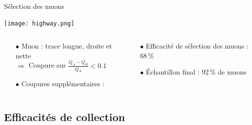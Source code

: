     \begin{frame}{Sélection des muons}
        \begin{scriptsize}
        \texttt{[image: highway.png]}
        \begin{columns}
            \begin{column}{0.5\textwidth}
                \begin{itemize}
                    \item[$\bullet$] Muon : trace longue, droite et nette \\ $\Rightarrow$ Coupure sur $\frac{Q_A-Q_B}{Q_A} < 0.1$
                    \item[$\bullet$] Coupures supplémentaires : \begin{itemize}\end{itemize}
                \end{itemize}
            \end{column}
            \begin{column}{0.5\textwidth}
                \begin{itemize}
                    \item[$\bullet$] Efficacité de sélection des muons : 68\,\%
                    \item[$\bullet$] Échantillon final : 92\,\% de muons
                \end{itemize}
            \end{column}
        \end{columns}
        \end{scriptsize}
    \end{frame}

    \subsection[Efficacités de collection]{Efficacités de collection}

